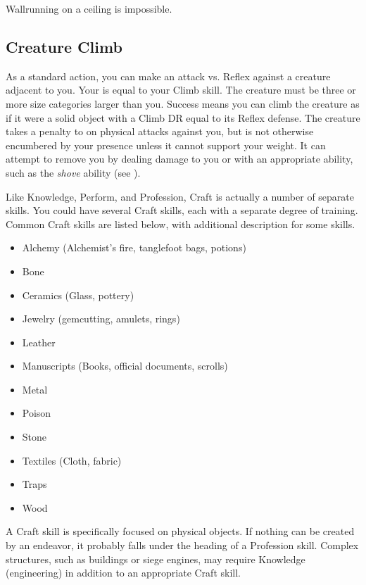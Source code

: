         Wallrunning on a ceiling is impossible.

    \subsection{Creature Climb}
        As a standard action, you can make an attack vs. Reflex against a creature adjacent to you.
        Your  is equal to your Climb skill.
        The creature must be three or more size categories larger than you.
        Success means you can climb the creature as if it were a solid object with a Climb DR equal to its Reflex defense.
        The creature takes a  penalty to  on physical attacks against you, but is not otherwise encumbered by your presence unless it cannot support your weight.
        It can attempt to remove you by dealing damage to you or with an appropriate ability, such as the \textit{shove} ability (see ).

\newpage
{}
    Like Knowledge, Perform, and Profession, Craft is actually a number of separate skills.
    You could have several Craft skills, each with a separate degree of training.
    Common Craft skills are listed below, with additional description for some skills.

    \begin{itemize}
        \item Alchemy (Alchemist's fire, tanglefoot bags, potions)
        \item Bone
        \item Ceramics (Glass, pottery)
        \item Jewelry (gemcutting, amulets, rings)
        \item Leather
        \item Manuscripts (Books, official documents, scrolls)
        \item Metal
        \item Poison
        \item Stone
        \item Textiles (Cloth, fabric)
        \item Traps
        \item Wood
    \end{itemize}


    A Craft skill is specifically focused on physical objects. If nothing can be created by an endeavor, it probably falls under the heading of a Profession skill. Complex structures, such as buildings or siege engines, may require Knowledge (engineering) in addition to an appropriate Craft skill.

